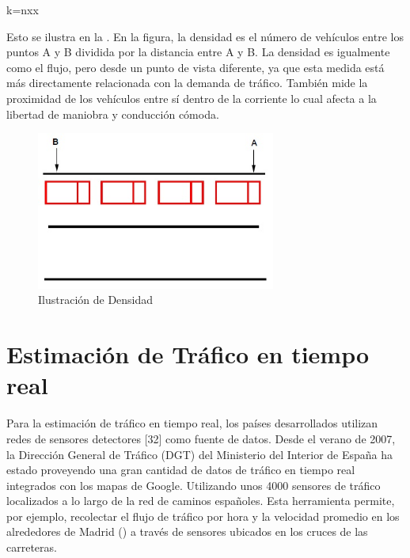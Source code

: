 k=nxx

Esto se ilustra en la . En la figura, la densidad es el número de vehículos entre los puntos A y B dividida por la distancia entre A y B. La densidad es igualmente como el flujo, pero desde un punto de vista diferente, ya que esta medida está más directamente relacionada con la demanda de tráfico. También mide la proximidad de los vehículos entre sí dentro de la corriente lo cual afecta a la libertad de maniobra y conducción cómoda.

\begin{figure}[h]
	\centering
	\includegraphics[width=0.7\textwidth]{capitulos/5/figuras/figura1.jpg}
	\caption{\label{fig:densidad} Ilustración de Densidad}	
\end{figure}

\section{Estimación de Tráfico en tiempo real}

Para la estimación de tráfico en tiempo real, los países desarrollados utilizan redes de sensores detectores [32] como fuente de datos. Desde el verano de 2007, la Dirección General de Tráfico (DGT) del Ministerio del Interior de España ha estado proveyendo una gran cantidad de datos de tráfico en tiempo real integrados con los mapas de Google. Utilizando unos 4000 sensores de tráfico localizados a lo largo de la red de caminos españoles. Esta herramienta permite, por ejemplo, recolectar el flujo de tráfico por hora y la velocidad promedio en los alrededores de Madrid () a través de sensores ubicados en los cruces de las carreteras.

